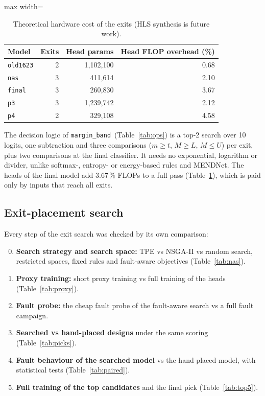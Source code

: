 \documentclass[10pt,a4paper]{article}
\newcommand{\meth}[1]{\texttt{#1}}
\newcommand{\ours}{\meth{margin\_band}}
\begin{document}
\begin{table}[H]
\centering\small
\caption{Theoretical hardware cost of the exits (HLS synthesis is future work).}
\label{tab:hw}
\begin{adjustbox}{max width=\linewidth}
\begin{tabular}{@{}lrrr@{}}
\toprule
Model & Exits & Head params & Head FLOP overhead (\%) \\
\midrule
\meth{old1623} & 2 & 1{,}102{,}100 & 0.68 \\
\meth{nas}     & 3 & 411{,}614     & 2.10 \\
\meth{final}   & 3 & 260{,}830     & 3.67 \\
\meth{p3}      & 3 & 1{,}239{,}742 & 2.12 \\
\meth{p4}      & 2 & 329{,}108     & 4.58 \\
\bottomrule
\end{tabular}
\end{adjustbox}
\end{table}

The decision logic of \ours\ (Table~\ref{tab:ops}) is a top-2 search over 10 logits, one subtraction and
three comparisons ($m\ge t$, $M\ge L$, $M\le U$) per exit, plus two comparisons at the final classifier.
It needs no exponential, logarithm or divider, unlike softmax-, entropy- or energy-based rules and MENDNet.
The heads of the final model add $3.67\,\%$ FLOPs to a full pass (Table~\ref{tab:hw}), which is paid only by
inputs that reach all exits.

\subsection{Exit-placement search}\label{sec:nasres}

Every step of the exit search was checked by its own comparison:
\begin{enumerate}
  \setcounter{enumi}{-1}
  \item \textbf{Search strategy and search space:} TPE vs NSGA-II vs random search, restricted spaces, fixed rules
        and fault-aware objectives (Table~\ref{tab:nas}).
  \item \textbf{Proxy training:} short proxy training vs full training of the heads (Table~\ref{tab:proxy}).
  \item \textbf{Fault probe:} the cheap fault probe of the fault-aware search vs a full fault campaign.
  \item \textbf{Searched vs hand-placed designs} under the same scoring (Table~\ref{tab:picks}).
  \item \textbf{Fault behaviour of the searched model} vs the hand-placed model, with statistical tests
        (Table~\ref{tab:paired}).
  \item \textbf{Full training of the top candidates} and the final pick (Table~\ref{tab:top5}).
\end{enumerate}
\end{document}
